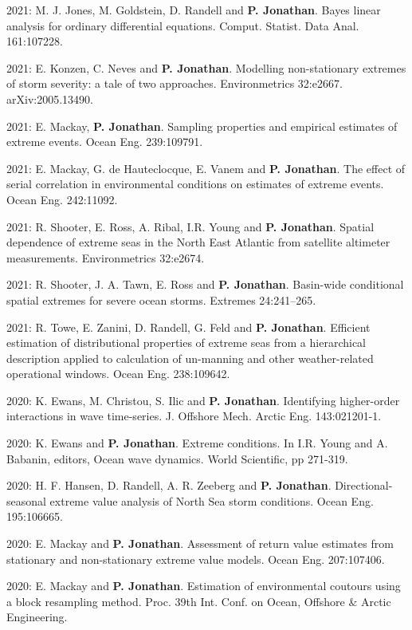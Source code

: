 \documentclass[11pt,a4paper]{moderncv}
\begin{document}
2021: M. J. Jones, M. Goldstein, D. Randell and \textbf{P. Jonathan}. Bayes linear analysis for ordinary differential equations. Comput. Statist. Data Anal. 161:107228.

2021: E. Konzen, C. Neves and \textbf{P. Jonathan}. Modelling non-stationary extremes of storm severity: a tale of two approaches. Environmetrics 32:e2667. arXiv:2005.13490.

2021: E. Mackay,  \textbf{P. Jonathan}. Sampling properties and empirical estimates of extreme events. Ocean Eng. 239:109791.

2021: E. Mackay, G. de Hauteclocque, E. Vanem and \textbf{P. Jonathan}. The effect of serial correlation in environmental conditions on estimates of extreme events. Ocean Eng. 242:11092.

2021: R. Shooter, E. Ross, A. Ribal, I.R. Young and \textbf{P. Jonathan}. Spatial dependence of extreme seas in the North East Atlantic from satellite altimeter measurements. Environmetrics 32:e2674.

2021: R. Shooter, J. A. Tawn, E. Ross  and \textbf{P. Jonathan}. Basin-wide conditional spatial extremes for severe ocean storms. Extremes 24:241--265.

2021: R. Towe, E. Zanini, D. Randell, G. Feld and \textbf{P. Jonathan}. Efficient estimation of distributional properties of extreme seas from a hierarchical description applied to calculation of un-manning and other weather-related operational windows. Ocean Eng. 238:109642.

2020: K. Ewans, M. Christou, S. Ilic and \textbf{P. Jonathan}. Identifying higher-order interactions in wave time-series. J. Offshore Mech. Arctic Eng. 143:021201-1.

2020: K. Ewans and \textbf{P. Jonathan}. Extreme conditions. In I.R. Young and A. Babanin, editors, Ocean wave dynamics. World Scientific, pp 271-319.

2020: H. F. Hansen, D. Randell, A. R. Zeeberg and \textbf{P. Jonathan}. Directional-seasonal extreme value analysis of North Sea storm conditions. Ocean Eng. 195:106665. 

2020: E. Mackay and \textbf{P. Jonathan}. Assessment of return value estimates from stationary and non-stationary extreme value models. Ocean Eng. 207:107406.

2020: E. Mackay and \textbf{P. Jonathan}. Estimation of environmental coutours using a block resampling method. Proc. 39th Int. Conf. on Ocean, Offshore \& Arctic Engineering.
\end{document}

